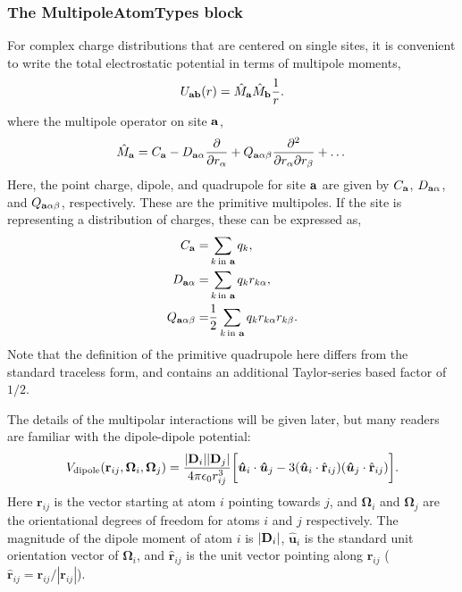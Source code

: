 \documentclass[]{book}
\begin{document}
\subsubsection{\label{section:ffMultipole}The MultipoleAtomTypes
  block}
For complex charge distributions that are centered on single sites, it
is convenient to write the total electrostatic potential in terms of
multipole moments,
\begin{equation}
U_{\bf{ab}}(r)=\hat{M}_{\bf a} \hat{M}_{\bf b} \frac{1}{r}  \label{kernel}.
\end{equation}
where the multipole operator on site $\bf a$,
\begin{equation}
\hat{M}_{\bf a} = C_{\bf a} - D_{{\bf a}\alpha} \frac{\partial}{\partial r_{\alpha}} 
+  Q_{{\bf a}\alpha\beta}
 \frac{\partial^2}{\partial r_{\alpha} \partial r_{\beta}} + \dots
\end{equation}
Here, the point charge, dipole, and quadrupole for site $\bf a$ are
given by $C_{\bf a}$, $D_{{\bf a}\alpha}$, and $Q_{{\bf
    a}\alpha\beta}$, respectively.  These are the primitive
multipoles.  If the site is representing a distribution of charges,
these can be expressed as,
\begin{align}
C_{\bf a} =&\sum_{k \, \text{in \bf a}} q_k , \label{eq:charge} \\
D_{{\bf a}\alpha} =&\sum_{k \, \text{in \bf a}} q_k r_{k\alpha}, \label{eq:dipole}\\
Q_{{\bf a}\alpha\beta} =& \frac{1}{2} \sum_{k \, \text{in \bf a}} q_k
r_{k\alpha}  r_{k\beta} . \label{eq:quadrupole}
\end{align}
Note that the definition of the primitive quadrupole here differs from
the standard traceless form, and contains an additional Taylor-series
based factor of $1/2$.  

The details of the multipolar interactions will be given later, but
many readers are familiar with the dipole-dipole potential:
\begin{equation}
V_{\text{dipole}}(\mathbf{r}_{ij},\boldsymbol{\Omega}_{i},
	\boldsymbol{\Omega}_{j}) = \frac{|{\bf D}_i||{\bf D}_j|}{4\pi\epsilon_{0}r_{ij}^{3}} \biggl[
	\boldsymbol{\hat{u}}_{i} \cdot \boldsymbol{\hat{u}}_{j}
	-
	3(\boldsymbol{\hat{u}}_i \cdot \hat{\mathbf{r}}_{ij}) %
		(\boldsymbol{\hat{u}}_j \cdot \hat{\mathbf{r}}_{ij}) \biggr].
\label{eq:dipolePot}
\end{equation}
Here $\mathbf{r}_{ij}$ is the vector starting at atom $i$ pointing
towards $j$, and $\boldsymbol{\Omega}_i$ and $\boldsymbol{\Omega}_j$
are the orientational degrees of freedom for atoms $i$ and $j$
respectively. The magnitude of the dipole moment of atom $i$ is $|{\bf
  D}_i|$, $\boldsymbol{\hat{u}}_i$ is the standard unit orientation
vector of $\boldsymbol{\Omega}_i$, and $\boldsymbol{\hat{r}}_{ij}$ is
the unit vector pointing along $\mathbf{r}_{ij}$
($\boldsymbol{\hat{r}}_{ij}=\mathbf{r}_{ij}/|\mathbf{r}_{ij}|$).
\end{document}
